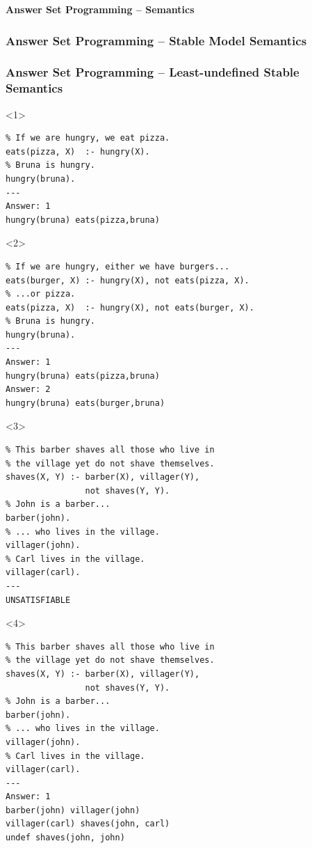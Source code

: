 \documentclass[aspectratio=169]{beamer}
\begin{document}
\begin{frame}[fragile]{\textbf{Answer Set Programming -- Semantics}}

\frametitle<1-3>{\textbf{Answer Set Programming -- Stable Model Semantics}}
\frametitle<4->{\textbf{Answer Set Programming -- Least-undefined Stable Semantics}}

\begin{minipage}{0.5\textwidth}
\begin{onlyenv}<1>
  \begin{verbatim}
% If we are hungry, we eat pizza.
eats(pizza, X)  :- hungry(X).
% Bruna is hungry.
hungry(bruna).
---
Answer: 1
hungry(bruna) eats(pizza,bruna)
  \end{verbatim}
\end{onlyenv}
\begin{onlyenv}<2>
  \begin{verbatim}
% If we are hungry, either we have burgers...
eats(burger, X) :- hungry(X), not eats(pizza, X).
% ...or pizza.
eats(pizza, X)  :- hungry(X), not eats(burger, X).
% Bruna is hungry.
hungry(bruna).
---
Answer: 1
hungry(bruna) eats(pizza,bruna)
Answer: 2
hungry(bruna) eats(burger,bruna)
  \end{verbatim}
\end{onlyenv}
\begin{onlyenv}<3>
  \begin{verbatim}
% This barber shaves all those who live in
% the village yet do not shave themselves.
shaves(X, Y) :- barber(X), villager(Y),
                not shaves(Y, Y).
% John is a barber...
barber(john).
% ... who lives in the village.
villager(john).
% Carl lives in the village.
villager(carl).
---
UNSATISFIABLE
  \end{verbatim}
\end{onlyenv}
\begin{onlyenv}<4>
  \begin{verbatim}
% This barber shaves all those who live in
% the village yet do not shave themselves.
shaves(X, Y) :- barber(X), villager(Y),
                not shaves(Y, Y).
% John is a barber...
barber(john).
% ... who lives in the village.
villager(john).
% Carl lives in the village.
villager(carl).
---
Answer: 1
barber(john) villager(john)
villager(carl) shaves(john, carl)
undef shaves(john, john)
  \end{verbatim}
\end{onlyenv}
\end{minipage}%
\begin{minipage}{0.5\textwidth}

\end{minipage}
\end{frame}
\end{document}
